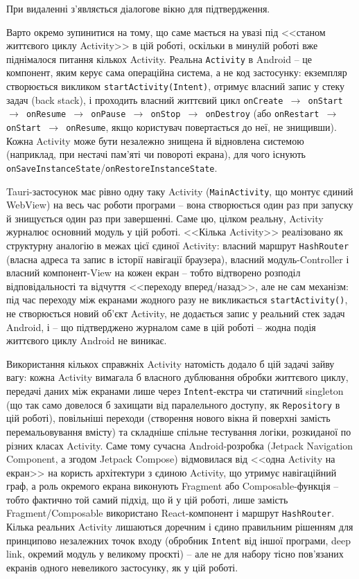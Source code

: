 \documentclass[14pt, a4paper]{extreport}
\begin{document}
	
	При видаленні з'являється діалогове вікно для підтвердження.
	

	Варто окремо зупинитися на тому, що саме мається на увазі під <<станом життєвого циклу Activity>> в цій роботі, оскільки в минулій роботі вже піднімалося питання кількох Activity. Реальна \texttt{Activity} в Android -- це компонент, яким керує сама операційна система, а не код застосунку: екземпляр створюється викликом \texttt{startActivity(Intent)}, отримує власний запис у стеку задач (back stack), і проходить власний життєвий цикл \texttt{onCreate $\rightarrow$ onStart $\rightarrow$ onResume $\rightarrow$ onPause $\rightarrow$ onStop $\rightarrow$ onDestroy} (або \texttt{onRestart $\rightarrow$ onStart $\rightarrow$ onResume}, якщо користувач повертається до неї, не знищивши). Кожна Activity може бути незалежно знищена й відновлена системою (наприклад, при нестачі пам'яті чи повороті екрана), для чого існують \texttt{onSaveInstanceState}/\texttt{onRestoreInstanceState}.

	Tauri-застосунок має рівно одну таку Activity (\texttt{MainActivity}, що монтує єдиний WebView) на весь час роботи програми -- вона створюється один раз при запуску й знищується один раз при завершенні. Саме цю, цілком реальну, Activity журналює основний модуль у цій роботі. <<Кілька Activity>> реалізовано як структурну аналогію в межах цієї єдиної Activity: власний маршрут \texttt{HashRouter} (власна адреса та запис в історії навігації браузера), власний модуль-Controller і власний компонент-View на кожен екран -- тобто відтворено розподіл відповідальності та відчуття <<переходу вперед/назад>>, але не сам механізм: під час переходу між екранами жодного разу не викликається \texttt{startActivity()}, не створюється новий об'єкт Activity, не додається запис у реальний стек задач Android, і -- що підтверджено журналом саме в цій роботі -- жодна подія життєвого циклу Android не виникає.

	Використання кількох справжніх Activity натомість додало б цій задачі зайву вагу: кожна Activity вимагала б власного дублювання обробки життєвого циклу, передачі даних між екранами лише через \texttt{Intent}-екстра чи статичний singleton (що так само довелося б захищати від паралельного доступу, як \texttt{Repository} в цій роботі), повільніші переходи (створення нового вікна й поверхні замість перемальовування вмісту) та складніше спільне тестування логіки, розкиданої по різних класах Activity. Саме тому сучасна Android-розробка (Jetpack Navigation Component, а згодом Jetpack Compose) відмовилася від <<одна Activity на екран>> на користь архітектури з єдиною Activity, що утримує навігаційний граф, а роль окремого екрана виконують Fragment або Composable-функція -- тобто фактично той самий підхід, що й у цій роботі, лише замість Fragment/Composable використано React-компонент і маршрут \texttt{HashRouter}. Кілька реальних Activity лишаються доречним і єдино правильним рішенням для принципово незалежних точок входу (обробник \texttt{Intent} від іншої програми, deep link, окремий модуль у великому проєкті) -- але не для набору тісно пов'язаних екранів одного невеликого застосунку, як у цій роботі.
\end{document}
